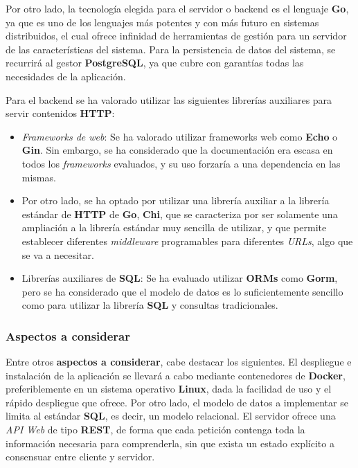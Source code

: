 \documentclass[11pt, a4paper, titlepage]{article}
\begin{document}
Por otro lado, la tecnología elegida para el servidor o backend es el lenguaje \textbf{Go}, ya que es uno de los lenguajes más potentes y con más futuro en sistemas distribuidos, el cual ofrece infinidad de herramientas de gestión para un servidor de las características del sistema. Para la persistencia de datos del sistema, se recurrirá al gestor \textbf{PostgreSQL}, ya que cubre con garantías todas las necesidades de la aplicación. \newline


Para el backend se ha valorado utilizar las siguientes librerías auxiliares para servir contenidos \textbf{HTTP}:

\begin{itemize}
    \item \textit{Frameworks de web}: Se ha valorado utilizar frameworks web como \textbf{Echo} o \textbf{Gin}. Sin embargo, se ha considerado que  la documentación era escasa en todos los \textit{frameworks} evaluados, y su uso forzaría a una dependencia en las mismas. 
    
    \item Por otro lado, se ha optado por utilizar una librería auxiliar a la librería estándar de \textbf{HTTP} de \textbf{Go}, \textbf{Chi}, que se caracteriza por ser solamente una ampliación a la librería estándar muy sencilla de utilizar, y que permite establecer diferentes \textit{middleware} programables para diferentes \textit{URLs}, algo que se va a necesitar.
    
    \item Librerías auxiliares de \textbf{SQL}: Se ha evaluado utilizar \textbf{ORMs} como \textbf{Gorm}, pero se ha considerado que el modelo de datos es lo suficientemente sencillo como para utilizar la librería \textbf{SQL} y consultas tradicionales.
\end{itemize}

\subsubsection{Aspectos a considerar}

Entre otros \textbf{aspectos a considerar}, cabe destacar los siguientes. El despliegue e instalación de la aplicación se llevará a cabo mediante contenedores de \textbf{Docker}, preferiblemente en un sistema operativo \textbf{Linux}, dada la facilidad de uso y el rápido despliegue que ofrece. Por otro lado, el modelo de datos a implementar se limita al estándar \textbf{SQL}, es decir, un modelo relacional. El servidor ofrece una \textit{API Web} de tipo \textbf{REST}, de forma que cada petición contenga toda la información necesaria para comprenderla, sin que exista un estado explícito a consensuar entre cliente y servidor. \newline
\end{document}
